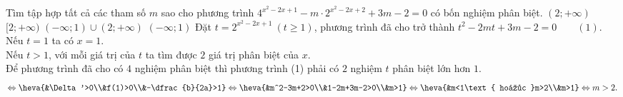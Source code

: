 \begin{ex}%
	Tìm tập hợp tất cả các tham số $m$ sao cho phương trình $4^{x^2-2x+1}-m\cdot2^{x^2-2x+2}+3m-2=0$ có bốn nghiệm phân biệt.
	\choice
	{\True $(2;+\infty)$}
	{$[2;+\infty)$}
	{$(-\infty;1)\cup(2;+\infty)$}
	{$(-\infty;1)$}
	\loigiai
	{
		Đặt $t=2^{x^2-2x+1}~(t\ge1)$, phương trình đã cho trở thành $t^2-2mt+3m-2=0\qquad(1)$.\\
		Nếu $t=1$ ta có $x=1$.\\
		Nếu $t>1$, với mỗi giá trị của $t$ ta tìm được $2$ giá trị phân biệt của $x$.\\
		Để phương trình đã cho có $4$ nghiệm phân biệt thì phương trình (1) phải có $2$ nghiệm $t$ phân biệt lớn hơn $1$.
		$$\Leftrightarrow\heva{&\Delta'>0\\&f(1)>0\\&-\dfrac{b}{2a}>1}\Leftrightarrow \heva{&m^2-3m+2>0\\&1-2m+3m-2>0\\&m>1}\Leftrightarrow \heva{&m<1\text{ hoặc }m>2\\&m>1}\Leftrightarrow m>2.$$
	}
\end{ex}


